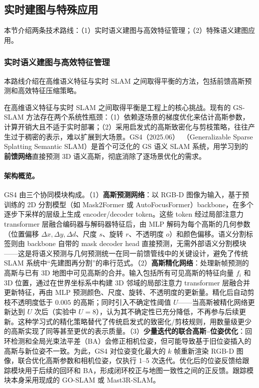 \subsection{实时建图与特殊应用}
\label{ss:15_9}

本节介绍两条技术路线：（1）实时语义建图与高效特征管理；（2）特殊语义建图应用。

\subsubsection{实时语义建图与高效特征管理}

本路线介绍在高维语义特征与实时 SLAM 之间取得平衡的方法，包括前馈高斯预测和高效特征压缩策略。

在高维语义特征与实时 SLAM 之间取得平衡是工程上的核心挑战。现有的 GS-SLAM 方法存在两个系统性瓶颈：（1）依赖逐场景的梯度优化来估计高斯参数，计算开销大且不适于实时部署；（2）采用启发式的高斯致密化与剪枝策略，往往产生过于稠密的表示，难以扩展到大场景。GS4（2025.06）~\cite{2506_06517}（Generalizable Sparse Splatting Semantic SLAM）是首个可泛化的 GS 语义 SLAM 系统，用学习到的\textbf{前馈网络}直接预测 3D 语义高斯，彻底消除了逐场景优化的需求。

\paragraph{架构概览。}
GS4 由三个协同模块构成。（1）\textbf{高斯预测网络}：以 RGB-D 图像为输入，基于预训练的 2D 分割模型（如 Mask2Former 或 AutoFocusFormer）backbone，在多个逐步下采样的层级上生成 encoder/decoder token。这些 token 经过局部注意力 transformer 层融合编码器与解码器特征后，由 MLP 解码为每个高斯的几何参数（位置偏移 $\Delta x, \Delta y, \Delta d$、尺度 $s$、旋转 $r$、不透明度 $o$）和颜色偏移。语义分割标签则由 backbone 自带的 mask decoder head 直接预测，无需外部语义分割模块——这是将语义预测与几何预测统一在同一前馈管线中的关键设计，避免了传统 SLAM 系统中``先建图再分割''的串行范式。（2）\textbf{高斯精化网络}：处理新帧预测的高斯与已有 3D 地图中可见高斯的合并。输入包括所有可见高斯的特征向量 $f_i$ 和 3D 位置，通过在世界坐标系中构建 3D 邻域的局部注意力 transformer 层融合并更新特征，再由 MLP 预测颜色、尺度、旋转、不透明度的更新量。精化后自动剪枝不透明度低于 $0.005$ 的高斯；同时引入不确定性阈值 $U$——当高斯被精化网络更新达到 $U$ 次后（实验中 $U\!=\!8$），认为其不确定性已充分降低，不再参与后续更新。这种学习式的精化策略替代了传统启发式的致密化/剪枝规则，用数量级更少的高斯实现了同等甚至更优的表示质量。（3）\textbf{少量迭代的联合高斯--位姿优化}：回环检测和全局光束法平差（BA）会修正相机位姿，但可能导致基于旧位姿插入的高斯与新位姿不一致。为此，GS4 对位姿变化最大的 $k$ 帧重新渲染 RGB-D 图像，联合优化高斯参数和相机位姿，仅执行 1--5 次迭代。优化后的位姿反馈给跟踪模块用于后续的回环和 BA，形成闭环校正与地图一致性之间的正反馈。跟踪模块本身采用现成的 GO-SLAM 或 Mast3R-SLAM。

